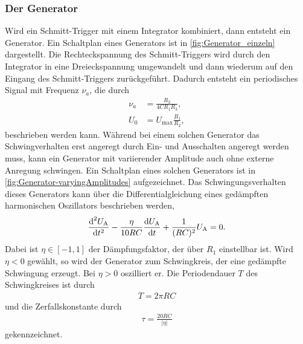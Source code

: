 \subsubsection{Der Generator}\label{subsubsec:Generator}                    %
Wird ein Schmitt-Trigger mit einem Integrator kombiniert, dann entsteht ein Generator.
Ein Schaltplan eines Generators ist in \autoref{fig:Generator_einzeln} dargestellt.
Die Rechteckspannung des Schmitt-Triggers wird durch den Integrator in eine Dreieckspannung umgewandelt und dann wiederum auf den Eingang des Schmitt-Triggers zurückgeführt.
Dadurch entsteht ein periodisches Signal mit Frequenz $\nu_a$, die durch 
\begin{align}
    \nu_a &= \frac{R_2}{4CR_1R_3}\label{eq:FrequenzGenerator}, \\
    U_0 &= U_{\text{max}}\frac{R_1}{R_2}\label{eq:AmplitudeGenerator},
\end{align}
beschrieben werden kann.
Während bei einem solchen Generator das Schwingverhalten erst angeregt durch Ein- und Ausschalten angeregt werden muss, kann ein Generator mit variierender Amplitude auch ohne externe Anregung schwingen.
Ein Schaltplan eines solchen Generators ist in \autoref{fig:Generator-varyingAmplitudes} aufgezeichnet.
Das Schwingungsverhalten dieses Generators kann über die Differentialgleichung eines gedämpften harmonischen Oszillators beschrieben werden,
\begin{align}
    \label{eq:DGLGenerator}
    \frac{\text d^2U_\text{A}}{\text dt^2}-\frac{\eta}{10RC}\frac{\text dU_\text{A}}{\text dt}+\frac{1}{(RC)^2}U_\text{A}=0.
\end{align}
Dabei ist $\eta\in[-1,1]$ der Dämpfungsfaktor, der über $R_1$ einstellbar ist.
Wird $\eta<0$ gewählt, so wird der Generator zum Schwingkreis, der eine gedämpfte Schwingung erzeugt.
Bei $\eta>0$ oszilliert er.
Die Periodendauer $T$ des Schwingkreises ist durch
\begin{align}
    \label{eq:PeriodendauerGenerator}
    T=2\pi RC
\end{align}
und die Zerfallskonstante durch 
\begin{align}
    \tau=\frac{20RC}{|\eta|}
\end{align}
gekennzeichnet.
